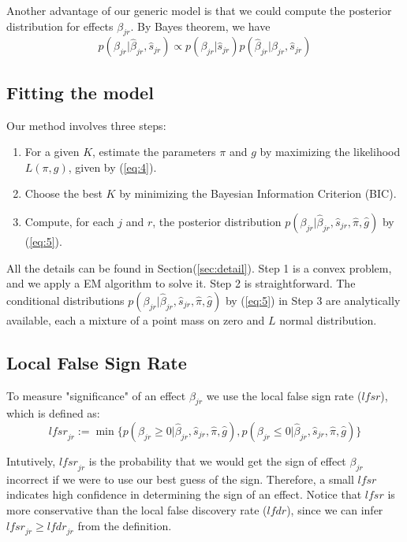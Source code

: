 \documentclass[11pt]{article}
\def\lfdr{\textit{lfdr}}
\def\lfsr{\textit{lfsr}}
\begin{document}
Another advantage of our generic model is that we could compute the posterior distribution for effects $\beta_{jr}$. By Bayes theorem, we have
\begin{equation}
    p(\beta_{jr}|\hat\beta_{jr},\hat s_{jr}) \propto p(\beta_{jr}|\hat s_{jr})p(\hat\beta_{jr}|\beta_{jr},\hat s_{jr})
    \label{eq:5}
\end{equation}

\subsection{Fitting the model}

Our method involves three steps:
\begin{enumerate}
    \item For a given $K$, estimate the parameters $\pi$ and $g$ by maximizing the likelihood $L(\pi,g)$, given by (\ref{eq:4}).
    \item Choose the best $K$ by minimizing the Bayesian Information Criterion (BIC).
    \item Compute, for each $j$ and $r$, the posterior distribution $p(\beta_{jr}|\hat\beta_{jr},\hat s_{jr},\hat\pi,\hat g)$ by (\ref{eq:5}).
\end{enumerate}

All the details can be found in Section(\ref{sec:detail}). Step 1 is a convex problem, and we apply a EM algorithm to solve it. Step 2 is straightforward. The conditional distributions $p(\beta_{jr}|\hat\beta_{jr},\hat s_{jr},\hat\pi,\hat g)$ by (\ref{eq:5}) in Step 3 are analytically available, each a mixture of a point mass on zero and $L$ normal distribution. 

\subsection{Local False Sign Rate}

To measure "significance" of an effect $\beta_{jr}$ we use the local false sign rate ($\lfsr$), which is defined as:
\begin{equation}
    \lfsr_{jr} := \min\{p(\beta_{jr}\geq 0|\hat\beta_{jr},\hat s_{jr},\hat\pi,\hat g), p(\beta_{jr}\leq 0|\hat\beta_{jr},\hat s_{jr},\hat\pi,\hat g)\}
\end{equation}

Intutively, $\lfsr_{jr}$ is the probability that we would get the sign of effect $\beta_{jr}$ incorrect if we were to use our best guess of the sign. Therefore, a small $\lfsr$ indicates high confidence in determining the sign of an effect. Notice that $\lfsr$ is more conservative than the local false discovery rate ($\lfdr$), since we can infer $\lfsr_{jr}\geq\lfdr_{jr}$ from the definition. 
\end{document}
